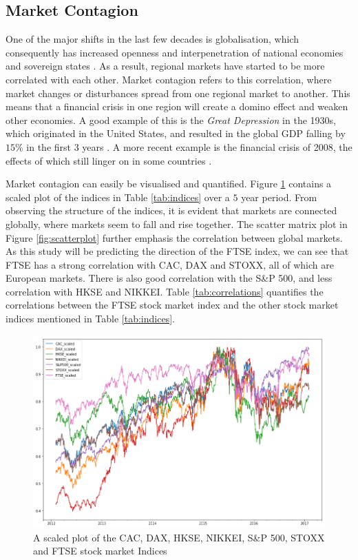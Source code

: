 \documentclass{UoYCSproject}
\begin{document}
\subsection{Market Contagion}
One of the major shifts in the last few decades is globalisation, which consequently has increased openness and interpenetration of national economies and sovereign states \cite{scott1999regions}. As a result, regional markets have started to be more correlated with each other. Market contagion refers to this correlation, where market changes or disturbances spread from one regional market to another. This means that a financial crisis in one region will create a domino effect and weaken other economies. A good example of this is the \textit{Great Depression} in the 1930s, which originated in the United States, and resulted in the global GDP falling by $15$\% in the first $3$ years \cite{rogerhistoryrepeating}. A more recent example is the financial crisis of 2008, the effects of which still linger on in some countries \cite{2008crisis}.  

Market contagion can easily be visualised and quantified. Figure \ref{fig:stockindexplot} contains a scaled plot of the indices in Table \ref{tab:indices} over a $5$ year period. From observing the structure of the indices, it is evident that markets are connected globally, where markets seem to fall and rise together. The scatter matrix plot in Figure \ref{fig:scatterplot} further emphasis the correlation between global markets. As this study will be predicting the direction of the FTSE index, we can see that FTSE has a strong correlation with CAC, DAX and STOXX, all of which are European markets. There is also good correlation with the S\&P 500, and less correlation with HKSE and NIKKEI. Table \ref{tab:correlations} quantifies the correlations between the FTSE stock market index and the other stock market indices mentioned in Table \ref{tab:indices}. 

\begin{figure}[h]
\includegraphics[width=12cm]{scaled_plot_of_indices}
\centering
\caption{A scaled plot of the CAC, DAX, HKSE, NIKKEI, S\&P 500, STOXX and FTSE stock market Indices} 
\label{fig:stockindexplot}
\end{figure}
\end{document}
